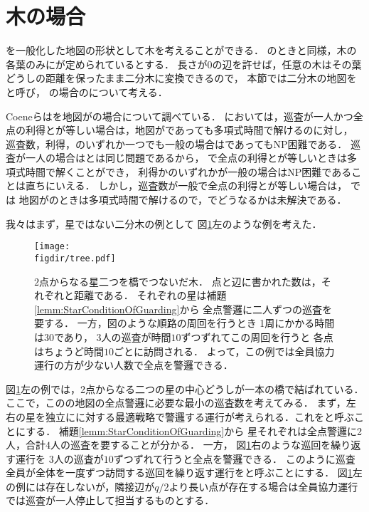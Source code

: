 \section*{木の場合}

{\graphStar}を一般化した地図の形状として木を考えることができる．
{\graphStar}のときと同様，木の各葉のみに{\maxIdletime}が定められているとする．
長さが$0$の辺を許せば，任意の木はその葉どうしの距離を保ったまま二分木に変換できるので，
本節では二分木の地図を{\graphTree}と呼び，
{\graphTree}の場合の{\PPProfit}について考える．

Coeneら\cite{coene2011charlemagne}は{\independentPP}を地図が{\graphTree}の場合について調べている．
{\independentPP}においては，巡査が一人かつ全点の利得と{\maxIdletime}が等しい場合は，地図が{\graphTree}であっても多項式時間で解ける\cite[Corollary~3]{coene2011charlemagne}のに対し，
巡査数，利得，{\maxIdletime}のいずれか一つでも一般の場合は{\graphStar}であってもNP困難である\cite[Theorems 5, 6 and 10]{coene2011charlemagne}．
巡査が一人の場合は{\PPProfit}と{\independentPP}は同じ問題であるから，
{\graphTree}で全点の利得と{\maxIdletime}が等しいときは多項式時間で解くことができ，
利得か{\maxIdletime}のいずれかが一般の場合はNP困難であることは直ちにいえる．
しかし，巡査数が一般で全点の利得と{\maxIdletime}が等しい場合は，
{\PPProfit}では
地図が{\graphStar}のときは多項式時間で解けるので，{\graphTree}でどうなるかは未解決である．

\newcommand{\separatedPatroll}{左右独立運行}
\newcommand{\cooperativePatroll}{全員協力運行}


我々はまず，星ではない二分木の例として
図\ref{figure: twoStarsTree}左のような例を考えた．
\begin{figure}
  \centering
  \texttt{[image: \\figdir/tree.pdf]}
  \caption{
    $2$点からなる星二つを橋でつないだ木．
    点と辺に書かれた数は，それぞれ{\maxIdletime}と距離である．
    それぞれの星は補題\ref{lemm:StarConditionOfGuarding}から
    全点警邏に二人ずつの巡査を要する．
    一方，図のような順路の周回を行うとき
    1周にかかる時間は$30$であり，
    $3$人の巡査が時間$10$ずつずれてこの周回を行うと
    各点はちょうど時間$10$ごとに訪問される．
    よって，この例では全員協力運行の方が少ない人数で全点を警邏できる．
  }
  \label{figure: twoStarsTree}
\end{figure}
図\ref{figure: twoStarsTree}左の例では，2点からなる二つの星の中心どうしが一本の橋で結ばれている．
ここで，この{\graphTree}の地図の全点警邏に必要な最小の巡査数を考えてみる．
%
まず，左右の星を独立に{\graphStar}に対する最適戦略で警邏する運行が考えられる．これを\defword{\separatedPatroll}と呼ぶことにする．
補題\ref{lemm:StarConditionOfGuarding}から
星それぞれは全点警邏に2人，合計$4$人の巡査を要することが分かる．
%
一方，
図\ref{figure: twoStarsTree}右のような巡回を繰り返す運行を
$3$人の巡査が{\maxIdletime}$10$ずつずれて行うと全点を警邏できる．
このように巡査全員が全体を一度ずつ訪問する巡回を繰り返す運行を\defword{\cooperativePatroll}と呼ぶことにする．
図\ref{figure: twoStarsTree}左の例には存在しないが，隣接辺が$q/2$より長い点が存在する場合は{\cooperativePatroll}では巡査が一人停止して担当するものとする．

